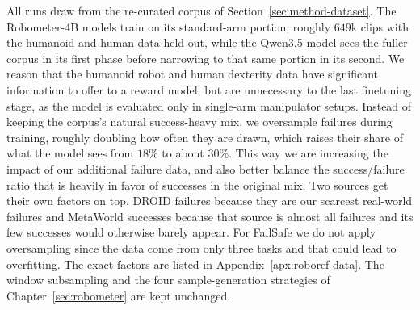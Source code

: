 All runs draw from the re-curated corpus of Section~\ref{sec:method-dataset}. The Robometer-4B models train on its standard-arm portion, roughly $649$k clips with the humanoid and human data held out, while the Qwen3.5 model sees the fuller corpus in its first phase before narrowing to that same portion in its second. We reason that the humanoid robot and human dexterity data have significant information to offer to a reward model, but are unnecessary to the last finetuning stage, as the model is evaluated only in single-arm manipulator setups. Instead of keeping the corpus's natural success-heavy mix, we oversample failures during training, roughly doubling how often they are drawn, which raises their share of what the model sees from $18\%$ to about $30\%$. This way we are increasing the impact of our additional failure data, and also better balance the success/failure ratio that is heavily in favor of successes in the original mix. Two sources get their own factors on top, DROID failures because they are our scarcest real-world failures and MetaWorld successes because that source is almost all failures and its few successes would otherwise barely appear. For FailSafe we do not apply oversampling since the data come from only three tasks and that could lead to overfitting. The exact factors are listed in Appendix~\ref{apx:roboref-data}. The window subsampling and the four sample-generation strategies of Chapter~\ref{sec:robometer} are kept unchanged.
